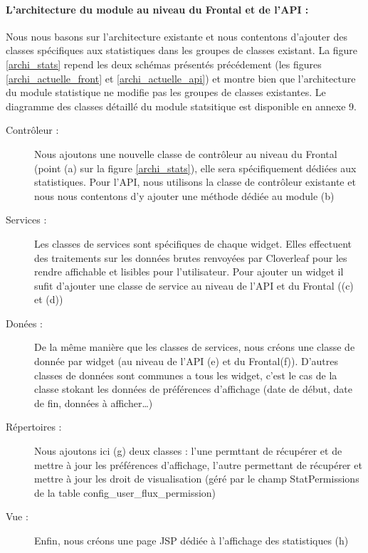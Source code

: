 			\paragraph{L'architecture du module au niveau du Frontal et de l'API :}
			Nous nous basons sur l'architecture existante et nous contentons d'ajouter
			des classes spécifiques aux statistiques dans les groupes de classes
			existant. La figure \ref{archi_stats} repend les deux schémas présentés
			précédement (les figures \ref{archi_actuelle_front} et
			\ref{archi_actuelle_api}) et montre bien que l'architecture du module
			statistique ne modifie pas les groupes de classes existantes. Le diagramme
			des classes détaillé du module statsitique est disponible en annexe 9.
			\begin{description}
				\item[Contrôleur :] Nous ajoutons une nouvelle classe de contrôleur au
				niveau du Frontal (point (a) sur la figure \ref{archi_stats}), elle sera
				spécifiquement dédiées aux statistiques. Pour l'API, nous utilisons la
				classe de contrôleur existante et nous nous contentons d'y ajouter une
				méthode dédiée au module (b)
				\item[Services :] Les classes de services sont spécifiques de chaque widget.
				Elles effectuent des traitements sur les données brutes renvoyées par
				Cloverleaf pour les rendre affichable et lisibles pour l'utilisateur. Pour
				ajouter un widget il sufit d'ajouter une classe de service au niveau de
				l'API et du Frontal ((c) et (d))
				\item[Donées :] De la même manière que les classes de services, nous créons
				une classe de donnée par widget (au niveau de
				l'API (e) et du Frontal(f)). D'autres classes de données sont communes
				a tous les widget, c'est le cas de la classe stokant les données de
				préférences d'affichage (date de début, date de fin, données à
				afficher\ldots)
				\item[Répertoires :] Nous ajoutons ici (g) deux classes : l'une permttant de
				récupérer et de mettre à jour les préférences d'affichage, l'autre
				permettant de récupérer et mettre à jour les droit de visualisation (géré
				par le champ StatPermissions de la table config\_user\_flux\_permission)
				\item[Vue :] Enfin, nous créons une page JSP dédiée à l'affichage des
				statistiques (h)
			\end{description}
